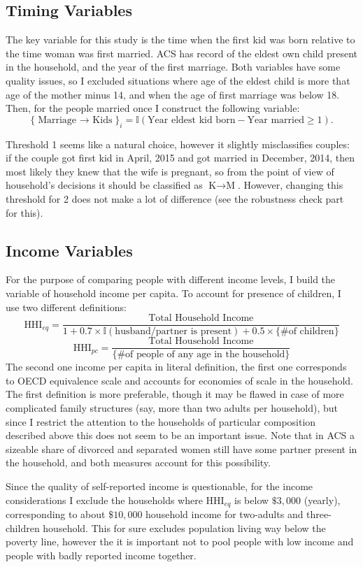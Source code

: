 \documentclass[12pt,letter]{article}
\newcommand{\I}{\mathbb{I}}
\begin{document}
\subsection{Timing Variables\label{km}}
The key variable for this study is the time when the first kid was born relative to the time woman was first married. ACS has record of the eldest own child present in the household, and the year of the first marriage. Both variables have some quality issues, so I excluded situations where age of the eldest child is more that age of the mother minus 14, and when the age of first marriage was below 18. Then, for the people married once I construct the following variable:
\[\{ \text{Marriage $\to$ Kids}\}_i = \I(\text{Year eldest kid born} - \text{Year married} \geq 1).\]

Threshold 1 seems like a natural choice, however it slightly misclassifies couples: if the couple got first kid in April, 2015 and got married in December, 2014, then most likely they knew that the wife is pregnant, so from the point of view of household's decisions it should be classified as $\text{K}\to\text{M}$. However, changing this threshold for 2 does not make a lot of difference (see the robustness check part for this).

\subsection{Income Variables}
For the purpose of comparing people with different income levels, I build the variable of household income per capita. To account for presence of children, I use two different definitions:
\[\text{HHI}_{eq} = \frac{\text{Total Household Income}}{1 + 0.7\times \I(\text{husband/partner is present}) + 0.5 \times \{ \text{\# of children}\}}\]
\[\text{HHI}_{pc} = \frac{\text{Total Household Income}}{\{\text{\# of people of any age in the household}\}}\]
The second one income per capita in literal definition, the first one corresponds to OECD equivalence scale and accounts for economies of scale in the household. The first definition is more preferable, though it may be flawed in case of more complicated family structures (say, more than two adults per household), but since I restrict the attention to the households of particular composition described above this does not seem to be an important issue. Note that in ACS a sizeable share of divorced and separated women still have some partner present in the household, and both measures account for this possibility. 

Since the quality of self-reported income is questionable, for the income considerations I exclude the households where $\text{HHI}_{eq}$ is below $\$3,000$ (yearly), corresponding to about $\$10,000$ household income for two-adults and three-children household. This for sure excludes population living way below the poverty line, however the it is important not to pool people with low income and people with badly reported income together.
\end{document}
